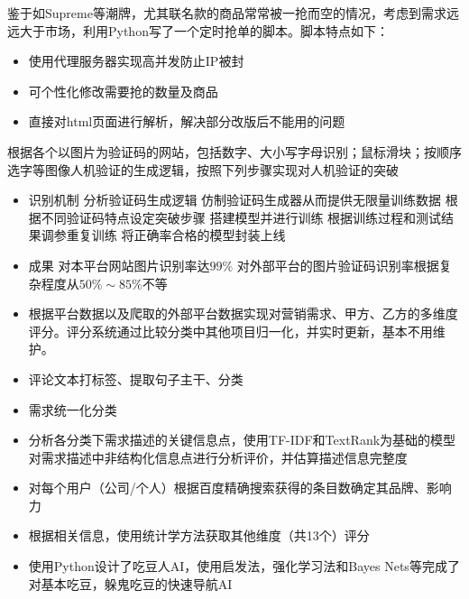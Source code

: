 \documentclass[9pt,a4paper]{altacv}
\begin{document}
\begin{fullwidth}
\begin{multicols}{2}
		\divider
		
		鉴于如Supreme等潮牌，尤其联名款的商品常常被一抢而空的情况，考虑到需求远远大于市场，利用Python写了一个定时抢单的脚本。脚本特点如下：
		\begin{itemize}
			\item 使用代理服务器实现高并发防止IP被封
			\item 可个性化修改需要抢的数量及商品
			\item 直接对html页面进行解析，解决部分改版后不能用的问题
		\end{itemize}
		
		\columnbreak
		
		根据各个以图片为验证码的网站，包括数字、大小写字母识别；鼠标滑块；按顺序选字等图像人机验证的生成逻辑，按照下列步骤实现对人机验证的突破
		\begin{itemize}
			\item 识别机制
				\subitem 分析验证码生成逻辑
				\subitem 仿制验证码生成器从而提供无限量训练数据
				\subitem 根据不同验证码特点设定突破步骤
				\subitem 搭建模型并进行训练
				\subitem 根据训练过程和测试结果调参重复训练
				\subitem 将正确率合格的模型封装上线
			\item 成果
				\subitem 对本平台网站图片识别率达$99\%$
				\subitem 对外部平台的图片验证码识别率根据复杂程度从$50\% \sim 85\%$不等
		\end{itemize}
		
		\divider
		
		\begin{itemize}
			\item 根据平台数据以及爬取的外部平台数据实现对营销需求、甲方、乙方的多维度评分。评分系统通过比较分类中其他项目归一化，并实时更新，基本不用维护。
			\item 评论文本打标签、提取句子主干、分类
			\item 需求统一化分类
			\item 分析各分类下需求描述的关键信息点，使用TF-IDF和TextRank为基础的模型对需求描述中非结构化信息点进行分析评价，并估算描述信息完整度
			\item 对每个用户（公司/个人）根据百度精确搜索获得的条目数确定其品牌、影响力
			\item 根据相关信息，使用统计学方法获取其他维度（共13个）评分
		\end{itemize}
		
		\divider
		
		\begin{itemize}
			\item 使用Python设计了吃豆人AI，使用启发法，强化学习法和Bayes Nets等完成了对基本吃豆，躲鬼吃豆的快速导航AI
		\end{itemize}
		
	\end{multicols}
	
\end{fullwidth}
\end{document}
